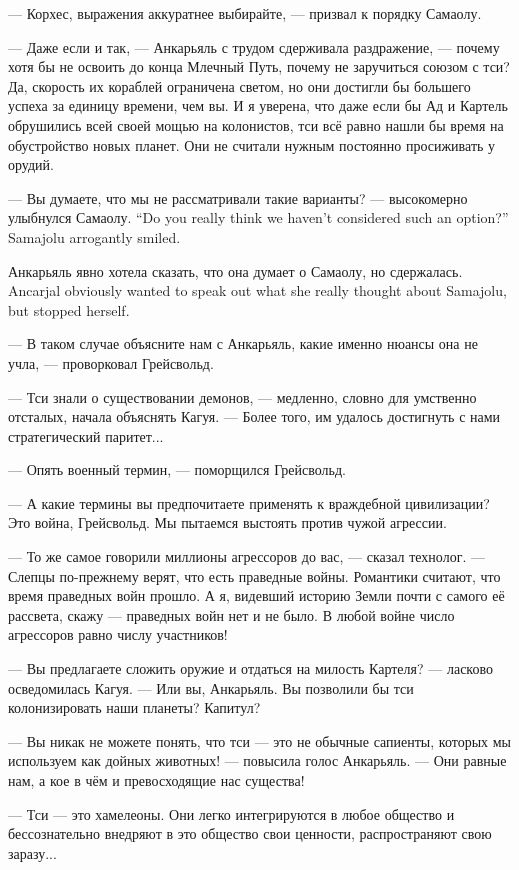 --- Корхес, выражения аккуратнее выбирайте, --- призвал к порядку Самаолу.

--- Даже если и так, --- Анкарьяль с трудом сдерживала раздражение, --- почему хотя бы не освоить до конца Млечный Путь, почему не заручиться союзом с тси?
Да, скорость их кораблей ограничена светом, но они достигли бы большего успеха за единицу времени, чем вы.
И я уверена, что даже если бы Ад и Картель обрушились всей своей мощью на колонистов, тси всё равно нашли бы время на обустройство новых планет.
Они не считали нужным постоянно просиживать у орудий.

{--- Вы думаете, что мы не рассматривали такие варианты? --- высокомерно улыбнулся Самаолу.}
{``Do you really think we haven't considered such an option?'' Samajolu arrogantly smiled.}

{Анкарьяль явно хотела сказать, что она думает о Самаолу, но сдержалась.}
{Ancarjal obviously wanted to speak out what she really thought about Samajolu, but stopped herself.}

--- В таком случае объясните нам с Анкарьяль, какие именно нюансы она не учла, --- проворковал Грейсвольд.

--- Тси знали о существовании демонов, --- медленно, словно для умственно отсталых, начала объяснять Кагуя.
--- Более того, им удалось достигнуть с нами стратегический паритет...

--- Опять военный термин, --- поморщился Грейсвольд.

--- А какие термины вы предпочитаете применять к враждебной цивилизации?
Это война, Грейсвольд.
Мы пытаемся выстоять против чужой агрессии.

--- То же самое говорили миллионы агрессоров до вас, --- сказал технолог.
--- Слепцы по-прежнему верят, что есть праведные войны.
Романтики считают, что время праведных войн прошло.
А я, видевший историю Земли почти с самого её рассвета, скажу --- праведных войн нет и не было.
В любой войне число агрессоров равно числу участников!

--- Вы предлагаете сложить оружие и отдаться на милость Картеля? --- ласково осведомилась Кагуя.
--- Или вы, Анкарьяль.
Вы позволили бы тси колонизировать наши планеты?
Капитул?

--- Вы никак не можете понять, что тси --- это не обычные сапиенты, которых мы используем как дойных животных! --- повысила голос Анкарьяль.
--- Они равные нам, а кое в чём и превосходящие нас существа!

--- Тси --- это хамелеоны.
Они легко интегрируются в любое общество и бессознательно внедряют в это общество свои ценности, распространяют свою заразу...

